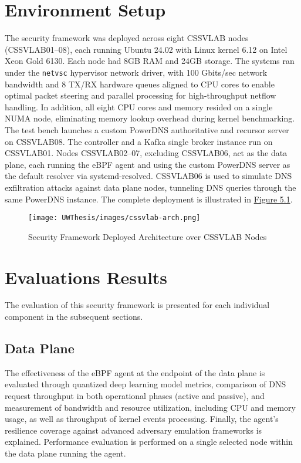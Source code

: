 \documentclass [11pt, proquest] {uwthesis}[2020/02/24]
\begin{document}
\section{Environment Setup}
The security framework was deployed across eight CSSVLAB nodes (CSSVLAB{01–08}), each running Ubuntu 24.02 with Linux kernel 6.12 on Intel Xeon Gold 6130. Each node had 8GB RAM and 24GB storage. The systems ran under the \texttt{netvsc} hypervisor network driver, with 100 Gbits/sec network bandwidth and 8 TX/RX hardware queues aligned to CPU cores to enable optimal packet steering and parallel processing for high-throughput netflow handling. In addition, all eight CPU cores and memory resided on a single NUMA node, eliminating memory lookup overhead during kernel benchmarking. The test bench launches a custom PowerDNS authoritative and recursor server on CSSVLAB08. The controller and a Kafka single broker instance run on CSSVLAB01. Nodes CSSVLAB{02–07}, excluding CSSVLAB06, act as the data plane, each running the eBPF agent and using the custom PowerDNS server as the default resolver via systemd-resolved. CSSVLAB06 is used to simulate DNS exfiltration attacks against data plane nodes, tunneling DNS queries through the same PowerDNS instance. The complete deployment is illustrated in \hyperref[sec:deployed-arch]{Figure 5.1}.


\begin{figure}[h]
\centering
\texttt{[image: UWThesis/images/cssvlab-arch.png]}
\caption{Security Framework Deployed Architecture over CSSVLAB Nodes}
\label{sec:deployed-arch}
\end{figure}

\section{Evaluations Results}
The evaluation of this security framework is presented for each individual component in the subsequent sections.

\subsection{Data Plane}
The effectiveness of the eBPF agent at the endpoint of the data plane is evaluated through quantized deep learning model metrics, comparison of DNS request throughput in both operational phases (active and passive), and measurement of bandwidth and resource utilization, including CPU and memory usage, as well as throughput of kernel events processing. Finally, the agent’s resilience coverage against advanced adversary emulation frameworks is explained. Performance evaluation is performed on a single selected node within the data plane running the agent.
\end{document}
